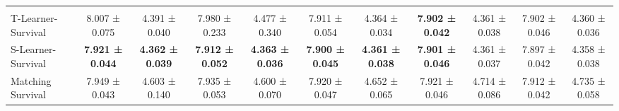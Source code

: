 \documentclass{article} %
\begin{document}
\begin{table}[!ht]
\begin{adjustbox}{angle=90,max height=0.95\textheight,center}
\begin{minipage}{\textheight}
\begin{subtable}{\linewidth}
\begin{tabular}{l cc cc cc cc cc}
        \addlinespace
        \multicolumn{9}{l}{\textit{Survival Meta-Learners}} \\ 
        T-Learner-Survival & 8.007 ± 0.075 & 4.391 ± 0.040 & 7.980 ± 0.233 & 4.477 ± 0.340 & 7.911 ± 0.054 & 4.364 ± 0.034 & \textbf{7.902 ± 0.042} & 4.361 ± 0.038 & 7.902 ± 0.046 & 4.360 ± 0.036 \\
        S-Learner-Survival & \textbf{7.921 ± 0.044} & \textbf{4.362 ± 0.039} & \textbf{7.912 ± 0.052} & \textbf{4.363 ± 0.036} & \textbf{7.900 ± 0.045} & \textbf{4.361 ± 0.038} & \textbf{7.901 ± 0.046} & 4.361 ± 0.037 & 7.897 ± 0.042 & 4.358 ± 0.038 \\
        Matching Survival & 7.949 ± 0.043 & 4.603 ± 0.140 & 7.935 ± 0.053 & 4.600 ± 0.070 & 7.920 ± 0.047 & 4.652 ± 0.065 & 7.921 ± 0.046 & 4.714 ± 0.086 & 7.912 ± 0.042 & 4.735 ± 0.058 \\ 
        \bottomrule
    \end{tabular}
    \end{subtable}

    \vspace{0.9em}


\end{minipage}
\end{adjustbox}
\end{table}
\end{document}
